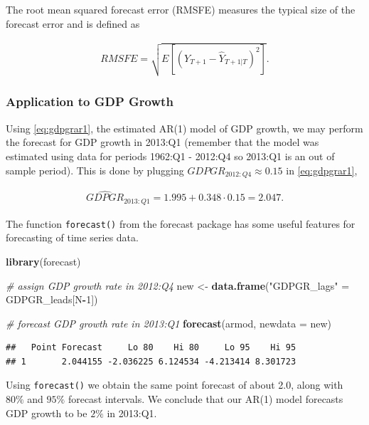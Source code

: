 \documentclass[]{book}
\newenvironment{Shaded}{\begin{snugshade}}{\end{snugshade}}
\newcommand{\KeywordTok}[1]{\textcolor[rgb]{0.13,0.29,0.53}{\textbf{#1}}}
\newcommand{\DataTypeTok}[1]{\textcolor[rgb]{0.13,0.29,0.53}{#1}}
\newcommand{\DecValTok}[1]{\textcolor[rgb]{0.00,0.00,0.81}{#1}}
\newcommand{\StringTok}[1]{\textcolor[rgb]{0.31,0.60,0.02}{#1}}
\newcommand{\CommentTok}[1]{\textcolor[rgb]{0.56,0.35,0.01}{\textit{#1}}}
\newcommand{\OperatorTok}[1]{\textcolor[rgb]{0.81,0.36,0.00}{\textbf{#1}}}
\newcommand{\NormalTok}[1]{#1}
\theoremstyle{definition}
\theoremstyle{definition}
\theoremstyle{definition}
\theoremstyle{remark}
\begin{document}
The root mean squared forecast error (RMSFE) measures the typical size
of the forecast error and is defined as

\begin{align*}
  RMSFE = \sqrt{E\left[\left(Y_{T+1} - \widehat{Y}_{T+1\vert T}\right)^2\right]}.
\end{align*}

\subsubsection*{Application to GDP
Growth}\label{application-to-gdp-growth}

Using \eqref{eq:gdpgrar1}, the estimated AR(1) model of GDP growth, we may
perform the forecast for GDP growth in 2013:Q1 (remember that the model
was estimated using data for periods 1962:Q1 - 2012:Q4 so 2013:Q1 is an
out of sample period). This is done by plugging
\(GDPGR_{2012:Q4} \approx 0.15\) in \eqref{eq:gdpgrar1},

\begin{align*}
  \widehat{GDPGR}_{2013:Q1} = 1.995 + 0.348 \cdot 0.15 = 2.047.
\end{align*}

The function \texttt{forecast()} from the forecast package has some
useful features for forecasting of time series data.

\begin{Shaded}
\begin{Highlighting}[]
\KeywordTok{library}\NormalTok{(forecast)}

\CommentTok{# assign GDP growth rate in 2012:Q4}
\NormalTok{new <-}\StringTok{ }\KeywordTok{data.frame}\NormalTok{(}\StringTok{"GDPGR_lags"}\NormalTok{ =}\StringTok{ }\NormalTok{GDPGR_leads[N}\OperatorTok{-}\DecValTok{1}\NormalTok{])}

\CommentTok{# forecast GDP growth rate in 2013:Q1}
\KeywordTok{forecast}\NormalTok{(armod, }\DataTypeTok{newdata =}\NormalTok{ new)}
\end{Highlighting}
\end{Shaded}

\begin{verbatim}
##   Point Forecast     Lo 80    Hi 80     Lo 95    Hi 95
## 1       2.044155 -2.036225 6.124534 -4.213414 8.301723
\end{verbatim}

Using \texttt{forecast()} we obtain the same point forecast of about
2.0, along with \(80\%\) and \(95\%\) forecast intervals. We conclude
that our AR(1) model forecasts GDP growth to be \(2\%\) in 2013:Q1.
\end{document}
